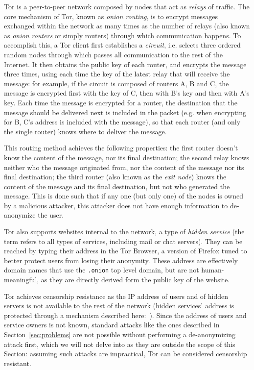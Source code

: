 \documentclass[mscthesis]{usiinfthesis}
\begin{document}
Tor is a peer-to-peer network composed by nodes that act as \emph{relays} of traffic. The core mechanism of Tor, known as \emph{onion routing}, is to encrypt messages exchanged within the network as many times as the number of relays (also known as \emph{onion routers} or simply routers) through which communication happens. To accomplish this, a Tor client first establishes a \emph{circuit}, i.e. selects three ordered random nodes through which passes all communication to the rest of the Internet. It then obtains the public key of each router, and encrypts the message three times, using each time the key of the latest relay that will receive the message: for example, if the circuit is composed of routers A, B and C, the message is encrypted first with the key of C, then with B's key and then with A's key. Each time the message is encrypted for a router, the destination that the message should be delivered next is included in the packet (e.g. when encrypting for B, C's address is included with the message), so that each router (and only the single router) knows where to deliver the message.

This routing method achieves the following properties: the first router doesn't know the content of the message, nor its final destination; the second relay knows neither who the message originated from, nor the content of the message nor its final destination; the third router (also known as the \emph{exit node}) knows the content of the message and its final destination, but not who generated the message. This is done such that if any one (but only one) of the nodes is owned by a malicious attacker, this attacker does not have enough information to de-anonymize the user.

Tor also supports websites internal to the network, a type of \emph{hidden service} (the term refers to all types of services, including mail or chat servers). They can be reached by typing their address in the Tor Browser, a version of Firefox tuned to better protect users from losing their anonymity. These address are effectively domain names that use the \texttt{.onion} top level domain, but are not human-meaningful, as they are directly derived form the public key of the website.

Tor achieves censorship resistance as the IP address of users and of hidden servers is not available to the rest of the network (hidden services' address is protected through a mechanism described here:~\cite{website:torhiddenservice}). Since the address of users and service owners is not known, standard attacks like the ones described in Section~\ref{sec:problems} are not possible without performing a de-anonymizing attack first, which we will not delve into as they are outside the scope of this Section: assuming such attacks are impractical, Tor can be considered censorship resistant.
\end{document}
